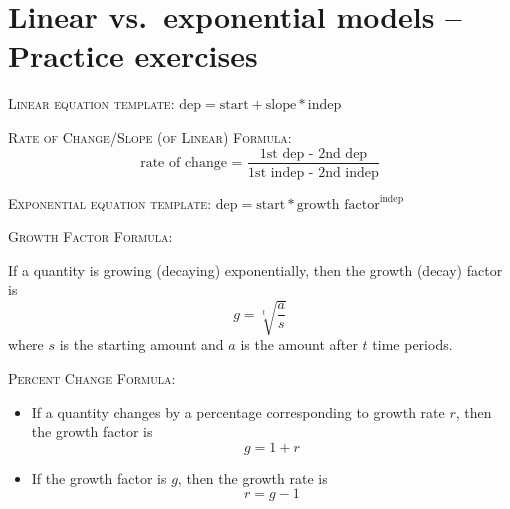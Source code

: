 
\section{Linear vs.\ exponential models -- Practice exercises}

\bigskip

 \noindent \hrulefill
 
 \bigskip
\noindent  \textsc{Linear equation template:} \quad $\text{dep}=\text{start}+\text{slope}\ast\text{indep}$

 \bigskip
  \bigskip
  
  \noindent \textsc{Rate of Change/Slope (of Linear) Formula:} \quad $$ \displaystyle \text{rate of change = }\frac{\text{1st dep - 2nd dep}}{\text{1st indep - 2nd indep}}$$

 \bigskip
  \noindent \hrulefill
  
 \bigskip
\noindent   \textsc{Exponential equation template:} \quad $\text{dep} = \text{start} \ast \text{growth factor} ^ {\text{indep}}$
 
 \bigskip
 \bigskip
 
\noindent \textsc{Growth Factor Formula:} \bigskip

If a quantity is growing (decaying) exponentially, then the growth (decay) factor is 
$$\displaystyle g = \sqrt[t]{\frac{a}{s}}$$ 
\quad where $s$ is the starting amount and $a$ is the amount after $t$ time periods.

\bigskip
\bigskip

 \noindent \textsc{Percent Change Formula:} 
\begin{itemize}
\item   If a quantity changes by a percentage corresponding to growth rate $r$, then the growth factor is $$\displaystyle g=1+r$$
\item If the growth factor is $g$, then the growth rate is $$r = g-1$$ ~
\end{itemize}
 \noindent \hrulefill

\newpage %

